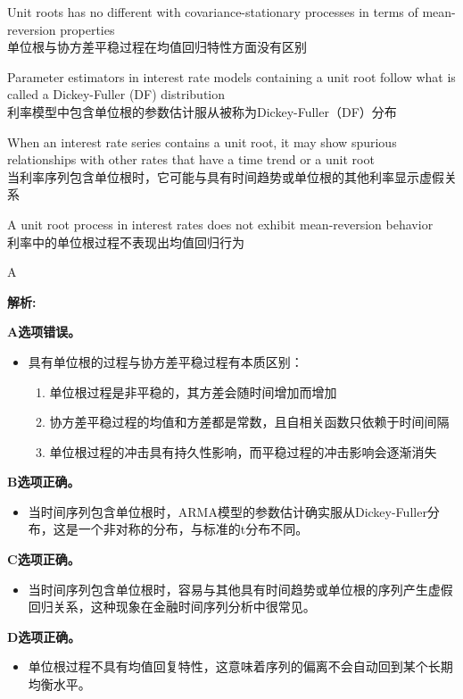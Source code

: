 \documentclass{article}
\newenvironment{explanation}
{\textbf{解析:}\par}
{\par}
\begin{document}
\begin{choices}
    \item Unit roots has no different with covariance-stationary processes in terms of mean-reversion properties\\
    单位根与协方差平稳过程在均值回归特性方面没有区别
    \item Parameter estimators in interest rate models containing a unit root follow what is called a Dickey-Fuller (DF) distribution\\
    利率模型中包含单位根的参数估计服从被称为Dickey-Fuller（DF）分布
    \item When an interest rate series contains a unit root, it may show spurious relationships with other rates that have a time trend or a unit root\\
    当利率序列包含单位根时，它可能与具有时间趋势或单位根的其他利率显示虚假关系
    \item A unit root process in interest rates does not exhibit mean-reversion behavior\\
    利率中的单位根过程不表现出均值回归行为
\end{choices}

\begin{correctanswer}
A
\end{correctanswer}

\begin{explanation}
\textbf{A选项错误。}
\begin{itemize}
    \item 具有单位根的过程与协方差平稳过程有本质区别：
    \begin{enumerate}
        \item 单位根过程是非平稳的，其方差会随时间增加而增加
        \item 协方差平稳过程的均值和方差都是常数，且自相关函数只依赖于时间间隔
        \item 单位根过程的冲击具有持久性影响，而平稳过程的冲击影响会逐渐消失
    \end{enumerate}
\end{itemize}

\textbf{B选项正确。}
\begin{itemize}
    \item 当时间序列包含单位根时，ARMA模型的参数估计确实服从Dickey-Fuller分布，这是一个非对称的分布，与标准的t分布不同。
\end{itemize}

\textbf{C选项正确。}
\begin{itemize}
    \item 当时间序列包含单位根时，容易与其他具有时间趋势或单位根的序列产生虚假回归关系，这种现象在金融时间序列分析中很常见。
\end{itemize}

\textbf{D选项正确。}
\begin{itemize}
    \item 单位根过程不具有均值回复特性，这意味着序列的偏离不会自动回到某个长期均衡水平。
\end{itemize}
\end{explanation}
\end{document}
